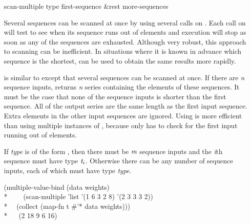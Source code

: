 \begin{defun}[Function]
scan-multiple type first-sequence &rest more-sequences

Several sequences can be scanned at once by using several calls on
.  Each call on  will test to see when its sequence runs
out of elements and execution will stop as soon as any of the sequences are
exhausted.  Although very robust, this approach to scanning can be
inefficient.  In situations where it is known in
advance which sequence is the shortest,  can be used to
obtain the same results more rapidly.
  
 is similar to  except that several sequences
can be scanned at once.  If there are \emph{n} sequence inputs,
 returns \emph{n} series containing the elements of these
sequences.  It must be the case that none of the sequence inputs is shorter
than the first sequence.  All of the output series are the same length as
the first input sequence.  Extra elements in the other input sequences are
ignored.  Using  is more efficient than using multiple
instances of , because  only has to check for
the first input running out of elements.

If \emph{type} is of the form , then
there must be $\emph{m}$ sequence inputs and the \emph{i\/}th sequence must have type
$\emph{t}_{i}$.  Otherwise there can be any number of sequence inputs, each of which
must have type \emph{type}.
\begin{lisp}
(multiple-value-bind (data weights) \\*
~~~~(scan-multiple 'list '(1 6 3 2 8) '(2 3 3 3 2)) \\*
~~(collect (map-fn t \#'* data weights))) \\*
~~{\EV} (2 18 9 6 16)
\end{lisp}
\end{defun}

